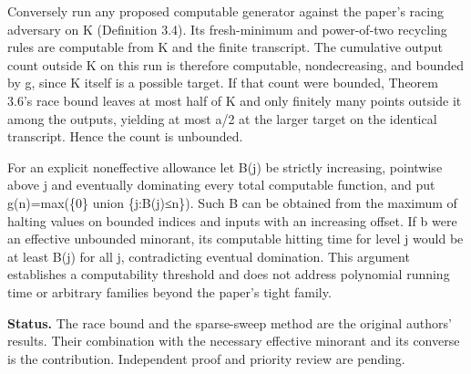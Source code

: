 \documentclass[11pt]{article}
\begin{document}
Conversely run any proposed computable generator against the paper's racing adversary on K (Definition 3.4). Its fresh-minimum and power-of-two recycling rules are computable from K and the finite transcript. The cumulative output count outside K on this run is therefore computable, nondecreasing, and bounded by g, since K itself is a possible target. If that count were bounded, Theorem 3.6's race bound leaves at most half of K and only finitely many points outside it among the outputs, yielding at most a/2 at the larger target on the identical transcript. Hence the count is unbounded.

For an explicit noneffective allowance let B(j) be strictly increasing, pointwise above j and eventually dominating every total computable function, and put g(n)=max(\{0\} union \{j:B(j)≤n\}). Such B can be obtained from the maximum of halting values on bounded indices and inputs with an increasing offset. If b were an effective unbounded minorant, its computable hitting time for level j would be at least B(j) for all j, contradicting eventual domination. This argument establishes a computability threshold and does not address polynomial running time or arbitrary families beyond the paper's tight family.

\textbf{Status.} The race bound and the sparse-sweep method are the original authors' results. Their combination with the necessary effective minorant and its converse is the contribution. Independent proof and priority review are pending.
\end{document}

